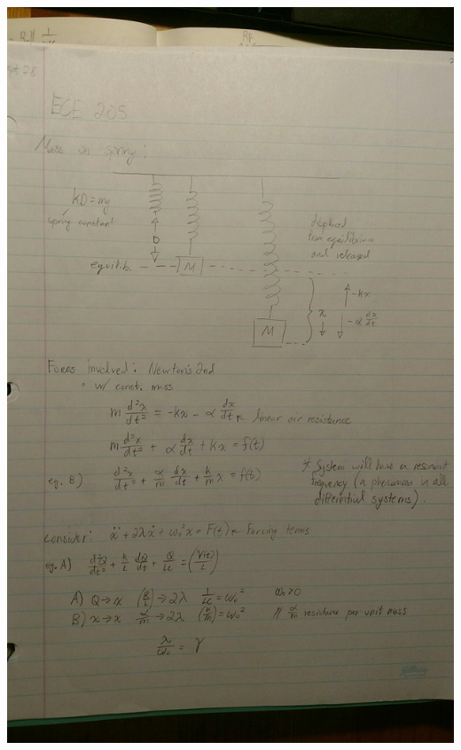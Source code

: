 \documentclass[11pt]{article}
\theoremstyle{definition}
\begin{document}
\includegraphics[width=\textwidth,height=\textheight,keepaspectratio]{friday/1.jpg}\\
\end{document}

